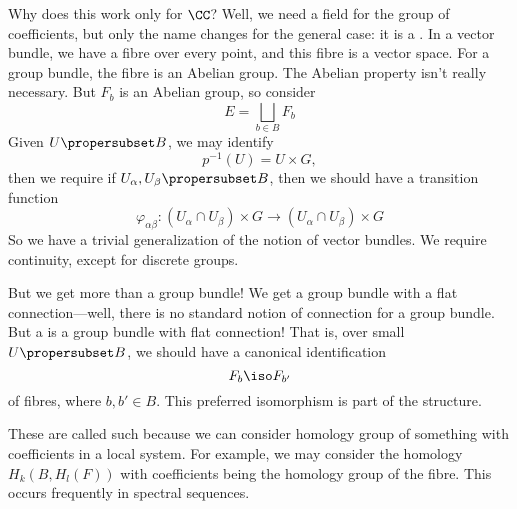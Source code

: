 Why does this work only for $\CC$? Well, we need a field for the
group of coefficients, but only the name changes for the general case: it is a 
. 
In a vector bundle, we have a fibre over every point, 
and this fibre is a vector space. For a group bundle, the fibre
is an Abelian group. The Abelian property isn't really
necessary. But $F_{b}$ is an Abelian group, so consider
\begin{equation}
E=\bigsqcup_{b\in B}F_{b}
\end{equation}
Given $U\propersubset B$, we may identify
\begin{equation}
p^{-1}(U)=U\times G,
\end{equation}
then we require if $U_{\alpha},U_{\beta}\propersubset B$, then we
should have a transition function
\begin{equation}
\varphi_{\alpha\beta}\colon (U_{\alpha}\cap U_{\beta})\times G\to
(U_{\alpha}\cap U_{\beta})\times G
\end{equation}
So we have a trivial generalization of the notion of vector
bundles. We require continuity, except for discrete groups.

But we get more than a group bundle! We get a group bundle with a
flat connection---well, there is no standard notion of connection
for a group bundle. But a  is a
group bundle with flat connection! That is, over small
$U\propersubset B$, we should have a canonical identification
\begin{equation}
F_{b}\iso F_{b'}
\end{equation}
of fibres, where $b,b'\in B$. This preferred isomorphism is part
of the structure. 

These are called such because we can consider homology group of
something with coefficients in a local system. For example, we
may consider the homology $H_{k}(B,H_{l}(F))$ with coefficients
being the homology group of the fibre. This occurs frequently in
spectral sequences.

